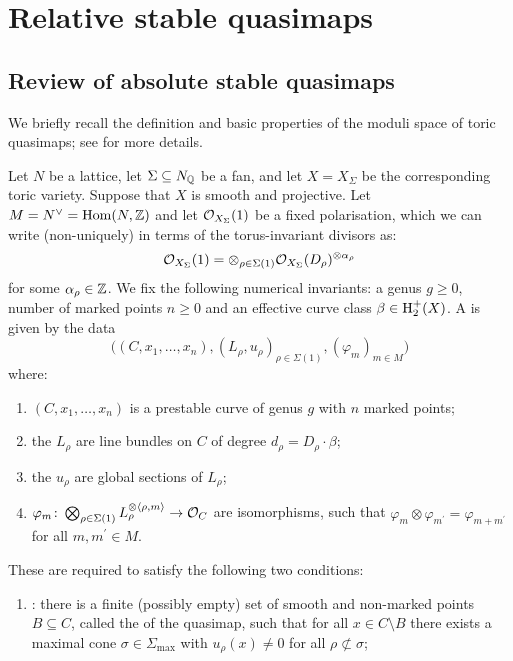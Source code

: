 \section{Relative stable quasimaps} \label{Section relative stable quasimaps}

\subsection{Review of absolute stable quasimaps} \label{Subsection stable quasimaps}
We briefly recall the definition and basic properties of the moduli space of toric quasimaps; see \cite{CF-K} for more details.
\begin{definition}[{\cite[Definition 3.1.1]{CF-K}}] Let $N$ be a lattice, let $\Sigma \subseteq N_{\mathbb{Q}}$ be a fan, and let $X= X_{\Sigma}$ be the corresponding toric variety.  Suppose that $X$ is smooth and projective.   Let $M = N^\vee = \operatorname{Hom}(N,\mathbb{Z})$ and let $\mathcal{O}_{X_\Sigma}(1)$ be a fixed polarisation, which we can write (non-uniquely) in terms of the torus-invariant divisors as:
\begin{equation*} \mathcal{O}_{X_\Sigma}(1) = \otimes_{\rho \in \Sigma(1)} \mathcal{O}_{X_\Sigma}(D_\rho)^{\otimes \alpha_\rho} \end{equation*}
for some $\alpha_\rho \in \mathbb{Z}$. We fix the following numerical invariants: a genus $g \geq 0$, number of marked points $n \geq 0$ and an effective curve class $\beta \in \operatorname{H}_2^+(X)$. A  is given by the data
\begin{equation*} \Big((C,x_1,\ldots,x_n), (L_\rho,u_\rho)_{\rho \in \Sigma(1)}, (\varphi_m)_{m \in M}\Big) \end{equation*}
where:
\begin{enumerate}
\item $(C,x_1,\ldots,x_n)$ is a prestable curve of genus $g$ with $n$ marked points;
\item the $L_\rho$ are line bundles on $C$ of degree $d_\rho = D_\rho \cdot \beta$;
\item the $u_\rho$ are global sections of $L_\rho$;
\item $\varphi_m \colon \bigotimes_{\rho \in \Sigma(1)} L_\rho^{\otimes \langle \rho, m \rangle} \rightarrow \mathcal{O}_C$ are isomorphisms, such that $\varphi_{m} \otimes \varphi_{m^\prime} = \varphi_{m + m^\prime}$ for all $m, m^\prime \in M$.
\end{enumerate}
These are required to satisfy the following two conditions:
\begin{enumerate}
\item {}: there is a finite (possibly empty) set of smooth and non-marked points $B \subseteq C$, called the  of the quasimap, such that for all $x \in C \setminus B$ there exists a maximal cone $\sigma \in \Sigma_{\operatorname{max}}$ with $u_\rho(x) \neq 0$ for all $\rho \not\subset \sigma$;

\end{enumerate}
\end{definition}
